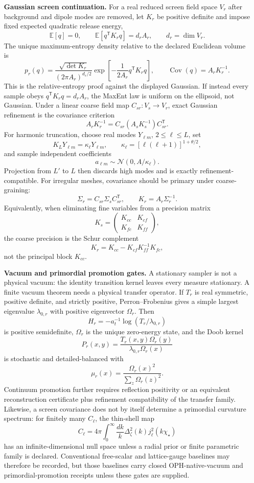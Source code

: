 \textbf{Gaussian screen continuation.} For a real reduced screen field space \(V_r\) after
background and dipole modes are removed, let \(K_r\) be positive definite and impose fixed
expected quadratic release energy,
\[
\mathbb E[q]=0,
\qquad
\mathbb E[q^{\mathsf T}K_rq]=d_rA_r,\qquad d_r=\dim V_r.
\]
The unique maximum-entropy density relative to the declared Euclidean volume is
\[
p_r(q)=
\frac{\sqrt{\det K_r}}{(2\pi A_r)^{d_r/2}}
\exp\left[-\frac{1}{2A_r}q^{\mathsf T}K_rq\right],
\qquad
\operatorname{Cov}(q)=A_rK_r^{-1}.
\]
This is the relative-entropy proof against the displayed Gaussian. If instead every sample obeys
\(q^{\mathsf T}K_rq=d_rA_r\), the MaxEnt law is uniform on the ellipsoid, not Gaussian. Under a
linear coarse field map \(C_{sr}:V_s\to V_r\), exact Gaussian refinement is the covariance
criterion
\[
A_rK_r^{-1}=C_{sr}(A_sK_s^{-1})C_{sr}^{\mathsf T}.
\]
For harmonic truncation, choose real modes \(Y_{\ell m}\), \(2\le\ell\le L\), set
\[
K_LY_{\ell m}=\kappa_\ell Y_{\ell m},
\qquad
\kappa_\ell=[\ell(\ell+1)]^{1+\theta/2},
\]
and sample independent coefficients
\[
a_{\ell m}\sim\mathcal N(0,A/\kappa_\ell).
\]
Projection from \(L'\) to \(L\) then discards high modes and is exactly refinement-compatible.
For irregular meshes, covariance should be primary under coarse-graining:
\[
\Sigma_r=C_{sr}\Sigma_sC_{sr}^{\mathsf T},\qquad K_r=A_r\Sigma_r^{-1}.
\]
Equivalently, when eliminating fine variables from a precision matrix
\[
K_s=\begin{pmatrix}K_{cc}&K_{cf}\\ K_{fc}&K_{ff}\end{pmatrix},
\]
the coarse precision is the Schur complement
\[
K_r=K_{cc}-K_{cf}K_{ff}^{-1}K_{fc},
\]
not the principal block \(K_{cc}\).

\textbf{Vacuum and primordial promotion gates.} A stationary sampler is not a physical vacuum:
the identity transition kernel leaves every measure stationary. A finite vacuum theorem needs a
physical transfer operator. If \(T_r\) is real symmetric, positive definite, and strictly positive,
Perron--Frobenius gives a simple largest eigenvalue \(\lambda_{0,r}\) with positive eigenvector
\(\Omega_r\). Then
\[
H_r=-a_t^{-1}\log(T_r/\lambda_{0,r})
\]
is positive semidefinite, \(\Omega_r\) is the unique zero-energy state, and the Doob kernel
\[
P_r(x,y)=\frac{T_r(x,y)\Omega_r(y)}{\lambda_{0,r}\Omega_r(x)}
\]
is stochastic and detailed-balanced with
\[
\mu_r(x)=\frac{\Omega_r(x)^2}{\sum_z\Omega_r(z)^2}.
\]
Continuum promotion further requires reflection positivity or an equivalent reconstruction
certificate plus refinement compatibility of the transfer family. Likewise, a screen covariance
does not by itself determine a primordial curvature spectrum: for finitely many \(C_\ell\), the
thin-shell map
\[
C_\ell=4\pi\int_0^\infty\frac{dk}{k}\Delta_\zeta^2(k)j_\ell^2(k\chi_\star)
\]
has an infinite-dimensional null space unless a radial prior or finite parametric family is
declared. Conventional free-scalar and lattice-gauge baselines may therefore be recorded,
but those baselines carry closed OPH-native-vacuum and primordial-promotion receipts unless these
gates are supplied.

